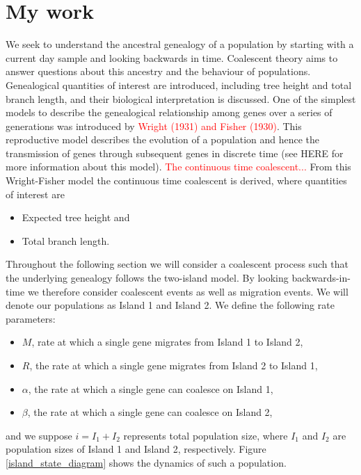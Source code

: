 \documentclass[12pt,a4paper]{article}
\begin{document}
\section{My work}
We seek to understand the ancestral genealogy of a population by starting with a current day sample and looking backwards in time. Coalescent theory aims to answer questions about this ancestry and the behaviour of populations. Genealogical quantities of interest are introduced, including tree height and total branch length, and their biological interpretation is discussed. One of the simplest models to describe the genealogical relationship among genes over a series of generations was introduced by \textcolor{red}{Wright (1931) and Fisher (1930)}. This reproductive model describes the evolution of a population and hence the transmission of genes through subsequent genes in discrete time (see HERE for more information about this model). \textcolor{red}{The continuous time coalescent...} From this Wright-Fisher model the continuous time coalescent is derived, where quantities of interest are 
\begin{itemize}
    \item Expected tree height and
    \item Total branch length.
\end{itemize}

Throughout the following section we will consider a coalescent process such that the underlying genealogy follows the two-island model. By looking backwards-in-time we therefore consider coalescent events as well as migration events. We will denote our populations as Island 1 and Island 2. We define the following rate parameters:

\begin{itemize}
    \item $M$, rate at which a single gene migrates from Island 1 to Island 2,
    \item $R$, the rate at which a single gene migrates from Island 2 to Island 1,
    \item $\alpha$, the rate at which a single gene can coalesce on Island 1,
    \item $\beta$, the rate at which a single gene can coalesce on Island 2,
\end{itemize}

and we suppose $i=I_1+I_2$ represents total population size, where $I_1$ and $I_2$ are population sizes of Island 1 and Island 2, respectively. Figure \ref{island_state_diagram} shows the dynamics of such a population.
\end{document}
